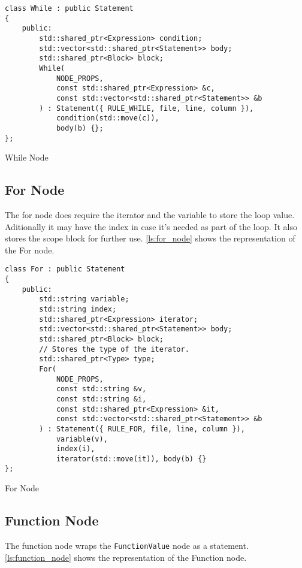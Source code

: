 \begin{listing}[H]
\begin{verbatim}
class While : public Statement
{
    public:
        std::shared_ptr<Expression> condition;
        std::vector<std::shared_ptr<Statement>> body;
        std::shared_ptr<Block> block;
        While(
            NODE_PROPS,
            const std::shared_ptr<Expression> &c,
            const std::vector<std::shared_ptr<Statement>> &b
        ) : Statement({ RULE_WHILE, file, line, column }),
            condition(std::move(c)),
            body(b) {};
};
\end{verbatim}
\caption{While Node}
\label{ls:while_node}
\end{listing}

\subsection{For Node}

The for node does require the iterator and the variable to store the loop value.
Aditionally it may have the index in case it's needed as part of the loop.
It also stores the scope block for further use.
\autoref{ls:for_node} shows the representation of the For node.

\begin{listing}[H]
\begin{verbatim}
class For : public Statement
{
    public:
        std::string variable;
        std::string index;
        std::shared_ptr<Expression> iterator;
        std::vector<std::shared_ptr<Statement>> body;
        std::shared_ptr<Block> block;
        // Stores the type of the iterator.
        std::shared_ptr<Type> type;
        For(
            NODE_PROPS,
            const std::string &v,
            const std::string &i,
            const std::shared_ptr<Expression> &it,
            const std::vector<std::shared_ptr<Statement>> &b
        ) : Statement({ RULE_FOR, file, line, column }),
            variable(v),
            index(i),
            iterator(std::move(it)), body(b) {}
};
\end{verbatim}
\caption{For Node}
\label{ls:for_node}
\end{listing}

\subsection{Function Node}

The function node wraps the \texttt{FunctionValue} node as a statement.
\autoref{ls:function_node} shows the representation of the Function node.

